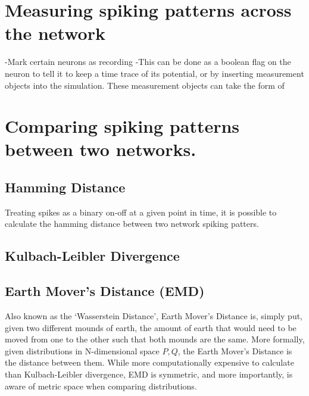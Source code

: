 \section{Measuring spiking patterns across the network}

-Mark certain neurons as recording
-This can be done as a boolean flag on the neuron to tell it to keep a time
trace of its potential, or by inserting measurement objects into the simulation.
These measurement objects can take the form of 

\section{Comparing spiking patterns between two networks.}

\subsection{Hamming Distance}
Treating spikes as a binary on-off at a given point in time, it is possible to
calculate the hamming distance between two network spiking patters. 

\subsection{Kulbach-Leibler Divergence}

\subsection{Earth Mover's Distance (EMD)}

Also known as the `Wasserstein Distance', Earth Mover's Distance is, simply put,
given two different mounds of earth, the amount of earth that would need to be
moved from one to the other such that both mounds are the same. More formally,
given distributions in N-dimensional space $P, Q$, the Earth Mover's Distance is
the distance between them. While more computationally expensive to calculate
than Kulbach-Leibler divergence, EMD is symmetric, and more importantly, is
aware of metric space when comparing distributions. 


